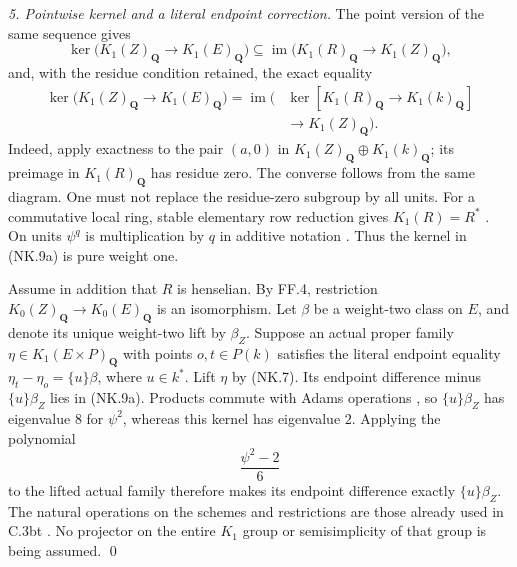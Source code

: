 \emph{5. Pointwise kernel and a literal endpoint correction.}
The point version of the same sequence gives
\begin{equation}
 \ker\bigl(K_1(Z)_{\mathbf Q}\to K_1(E)_{\mathbf Q}\bigr)
   \subseteq\operatorname{im}\bigl(K_1(R)_{\mathbf Q}
                                      \to K_1(Z)_{\mathbf Q}\bigr),
                                                        \tag{NK.9}
\end{equation}
and, with the residue condition retained, the exact equality
\begin{equation}
\begin{split}
 \ker\bigl(K_1(Z)_{\mathbf Q}\to K_1(E)_{\mathbf Q}\bigr)
 =\operatorname{im}\bigl(&\ker[K_1(R)_{\mathbf Q}\to K_1(k)_{\mathbf Q}]\\
                         &\longrightarrow K_1(Z)_{\mathbf Q}\bigr).
\end{split}                                               \tag{NK.9a}
\end{equation}
Indeed, apply exactness to the pair $(a,0)$ in
$K_1(Z)_{\mathbf Q}\oplus K_1(k)_{\mathbf Q}$; its preimage in
$K_1(R)_{\mathbf Q}$ has residue zero.  The converse follows from
the same diagram.  One must not replace the residue-zero subgroup
by all units.  For a commutative local ring, stable elementary row
reduction gives $K_1(R)=R^*$
\citep[Chapter III, Lemma 1.4 and proof]{frNKWeibelLocalKone}.
On units $\psi^q$ is multiplication by $q$ in additive notation
\citep[Chapter IV, Example 5.4.1]{frNKWeibelAdams}.
Thus the kernel in (NK.9a) is pure weight one.

Assume in addition that $R$ is henselian.  By FF.4, restriction
$K_0(Z)_{\mathbf Q}\to K_0(E)_{\mathbf Q}$ is an isomorphism.
Let $\beta$ be a weight-two class on $E$, and denote its unique
weight-two lift by $\beta_Z$.  Suppose an actual proper family
$\eta\in K_1(E\times P)_{\mathbf Q}$ with points $o,t\in P(k)$
satisfies the literal endpoint equality
$\eta_t-\eta_o=\{u\}\beta$, where $u\in k^*$.
Lift $\eta$ by (NK.7).  Its endpoint difference minus
$\{u\}\beta_Z$ lies in (NK.9a).  Products commute with Adams
operations \citep[Chapter IV, Theorem 5.9 and proof]{frNKWeibelAdams},
so $\{u\}\beta_Z$ has eigenvalue $8$ for $\psi^2$, whereas this
kernel has eigenvalue $2$.  Applying the polynomial
\begin{equation}
                              \frac{\psi^2-2}{6}          \tag{NK.10}
\end{equation}
to the lifted actual family therefore makes its endpoint difference
exactly $\{u\}\beta_Z$.  The natural operations on the schemes
and restrictions are those already used in C.3bt
\citep[p.~258, paragraph preceding Lemma 2.1]{frC3bcLevine1994}.
No projector on the entire $K_1$ group or semisimplicity of that
group is being assumed.
\qed

